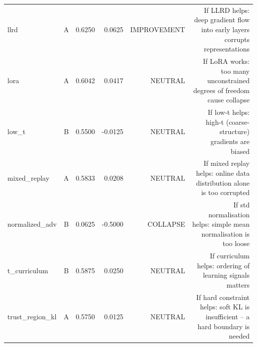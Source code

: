 \begin{table}[htbp]
\begin{tabular}{lrrrrr}
llrd & A & 0.6250 & 0.0625 & IMPROVEMENT & If LLRD helps: deep gradient flow into early layers corrupts representations \\
lora & A & 0.6042 & 0.0417 & NEUTRAL & If LoRA works: too many unconstrained degrees of freedom cause collapse \\
low\_t & B & 0.5500 & -0.0125 & NEUTRAL & If low-t helps: high-t (coarse-structure) gradients are biased \\
mixed\_replay & A & 0.5833 & 0.0208 & NEUTRAL & If mixed replay helps: online data distribution alone is too corrupted \\
normalized\_adv & B & 0.0625 & -0.5000 & COLLAPSE & If std normalisation helps: simple mean normalisation is too loose \\
t\_curriculum & B & 0.5875 & 0.0250 & NEUTRAL & If curriculum helps: ordering of learning signals matters \\
trust\_region\_kl & A & 0.5750 & 0.0125 & NEUTRAL & If hard constraint helps: soft KL is insufficient -- a hard boundary is needed \\
\bottomrule
\end{tabular}
\end{table}